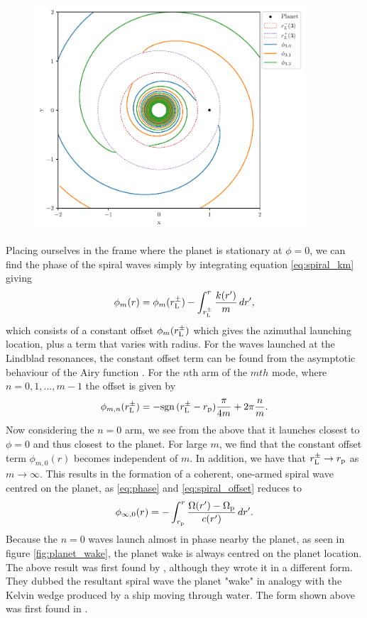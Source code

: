 \begin{figure}
    \centering
    \includegraphics[width = 0.9\textwidth]{figures/wakes_m3.pdf}
    \caption{}
    \label{fig:wakes_m3}
\end{figure}
Placing ourselves in the frame where the planet is stationary at $\phi = 0$, we can find the phase of the spiral waves simply by integrating equation \ref{eq:spiral_km} giving \citep{bae2018a}
\begin{align}
    \phi_m (r) = \phi_m(r_{\rm L}^\pm) - \int_{r_{\rm L}^\pm}^r \frac{k(r')}{m} \, dr', \label{eq:phase}
\end{align}
which consists of a constant offset $\phi_m(r_{\rm L}^\pm)$ which gives the azimuthal launching location, plus a term that varies with radius.
For the waves launched at the Lindblad resonances, the constant offset term can be found from the asymptotic behaviour of the Airy function \citep{ward1986}. 
For the $n$th arm of the $mth$ mode, where $n = 0, 1, ..., m-1$ the offset is given by 
\begin{align}
    \phi_{m,n}(r_{\rm L}^\pm) = - \mathrm{sgn}\, (r_{\rm L}^\pm - r_{\rm p}) \frac{\pi}{4m} + 2 \pi\frac{n}{m}. \label{eq:spiral_offset}
\end{align}
Now considering the $n=0$ arm, we see from the above that it launches closest to $\phi=0$ and thus closest to the planet.
For large $m$, we find that the constant offset term $\phi_{m,0}(r)$ becomes independent of $m$.
In addition, we have that $r_{\rm L}^\pm \rightarrow r_{\rm p}$ as $m \rightarrow \infty$.
This results in the formation of a coherent, one-armed spiral wave centred on the planet, as \ref{eq:phase} and \ref{eq:spiral_offset} reduces to
\begin{align}
    \phi_{\infty,0}(r) = - \int_{r_{\rm p}}^ r \frac{\Omega(r') - \Omega_{\rm p}}{c(r')} \, dr'. \label{eq:planet_wake}
\end{align}
Because the $n=0$ waves launch almost in phase nearby the planet, as seen in figure \ref{fig:planet_wake}, the planet wake is always centred on the planet location. 
The above result was first found by \citet{ogilvie2002}, although they wrote it in a different form. 
They dubbed the resultant spiral wave the planet "wake" in analogy with the Kelvin wedge produced by a ship moving through water.
The form shown above was first found in \citet{rafikov2002a}.

